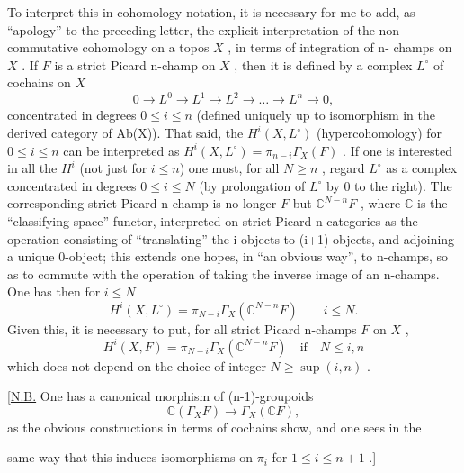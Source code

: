 \documentclass[11pt]{article}
\newcommand{\scanpage}[1]{\par\bigskip\noindent{\small\sffamily[scan #1]}\par}
\newcommand{\mspage}[1]{{\small\sffamily[p.\,#1]}}
\newcommand{\hand}[1]{\textcolor{blue}{#1}}
\newcommand{\uline}[1]{\underline{#1}}
\begin{document}
To interpret this in cohomology notation, it is necessary for me to add,
as ``apology'' to the preceding letter, the explicit interpretation of the
non-commutative cohomology on a topos $X$ , in terms of integration of n-
champs on $X$ . If $F$ is a strict Picard n-champ on $X$ , then it is defined
by a complex $L^{\circ}$ of cochains on $X$
\[ 0 \to L^0 \to L^1 \to L^2 \to \ldots \to L^n \to 0 , \]
concentrated in degrees $0 \leq i \leq n$ (defined uniquely up to isomorphism in
the derived category of Ab(X)). That said, the $H^i(X, L^{\circ})$ (hypercohomology)
for $0 \leq i \leq n$ can be interpreted as $H^i(X, L^{\circ}) = \pi_{n-i}\Gamma_X(F)$ . If one is
interested in all the $H^i$ (not just for $i \leq n$) one must, for all $N \geq n$ ,
regard $L^{\circ}$ as a complex concentrated in degrees $0 \leq i \leq N$ (by prolongation
of $L^{\circ}$ by 0 to the right). The corresponding strict Picard n-champ is no
longer $F$ but $\mathbb{C}^{N-n}F$ , where $\mathbb{C}$ is the ``classifying space'' functor, interpreted
on strict Picard n-categories as the operation consisting of ``translating''
the i-objects to (i+1)-objects, and adjoining a unique 0-object; this extends
one hopes, in ``an obvious way'', to n-champs, so as to commute with the operation
of taking the inverse image of an n-champs. One has then for $i \leq N$
\[ H^i(X, L^{\circ}) = \pi_{N-i}\Gamma_X(\mathbb{C}^{N-n}F) \qquad i \leq N . \]
Given this, it is necessary to put, for all strict Picard n-champs $F$ on $X$ ,
\[ H^i(X, F) = \pi_{N-i}\Gamma_X(\mathbb{C}^{N-n}F) \quad \text{if} \quad N \leq i, n \]
which does not depend on the choice of integer $N \geq \sup(i, n)$ .

[\uline{N.B.} One has a canonical morphism of (n-1)-groupoids
\[ \mathbb{C}(\Gamma_X F) \longrightarrow \Gamma_X(\mathbb{C}F) , \]
as the obvious constructions in terms of cochains show, and one sees in the

\mspage{\hand{125}}

\clearpage
\scanpage{134-2/125}
\mspage{- 4 -}

same way that this induces isomorphisms on $\pi_i$ for $1 \leq i \leq n + 1$ .]
\end{document}
